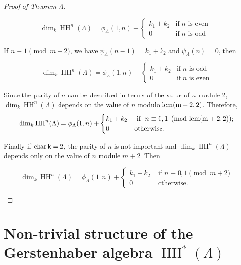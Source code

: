 \documentclass{amsart}
\theoremstyle{plain}
\theoremstyle{definition}
\begin{document}
\begin{proof}[Proof of Theorem A]
\begin{itemize}
\begin{equation*}  {\operatorname{dim}_k\operatorname{HH}^{{n}}(\Lambda)}= \phi_{\Lambda}(1,n)+ \begin{cases} k_1+k_2 &  \text{if } n \mbox{ is  even }\\ 0 & \text{if } n \mbox{ is   odd} \end{cases} \end{equation*}

If $n\equiv 1 \pmod{m+2}$, we have $\psi_{\Lambda}(n-1)= k_1+k_2$ and $\psi_{\Lambda}(n)=0$, then

\begin{equation*}  {\operatorname{dim}_k\operatorname{HH}^{{n}}(\Lambda)}= \phi_{\Lambda}(1,n)+ \begin{cases} k_1+k_2 &  \text{if } n \mbox{ is  odd }\\ 0 & \text{if } n \mbox{ is   even} \end{cases} \end{equation*}

Since the parity of $n$ can be described in terms of the value of $n$ module $2$, ${\operatorname{dim}_k\operatorname{HH}^{{n}}(\Lambda)}$ depends on the value of $n$ modulo $\rm lcm(m+2,2)$. Therefore,  $${\operatorname{dim}_k\operatorname{HH}^{{n}}(\Lambda)}= \phi_{\Lambda}(1,n)+ \begin{cases} k_1+k_2 & \mbox{ if \ } n\equiv 0,1 \pmod{\rm lcm(m+2,2)}; \\ 0 &
\mbox{otherwise.} \end{cases}$$

Finally if $\operatorname{char} {{\normalfont{\textsf{k}}}}=2$, the parity of $n$ is not important and  ${\operatorname{dim}_k\operatorname{HH}^{{n}}(\Lambda)}$ depends only   on  the value of $n$ module
$m+2$. Then:

$${\operatorname{dim}_k\operatorname{HH}^{{n}}(\Lambda)}=\phi_{\Lambda}(1,n) + \begin{cases} k_1+k_2 & \mbox{ if $n\equiv 0,1\pmod {m+2} $}\\ 0 & \mbox{ otherwise.} \end{cases}$$

\end{itemize}
\end{proof}

\section{Non-trivial structure of the Gerstenhaber algebra $\operatorname{HH}^*(\Lambda)$}
\end{document}
